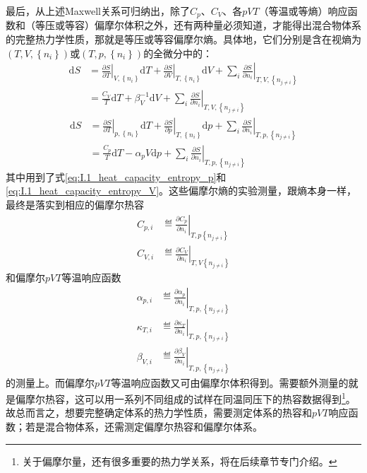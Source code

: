 \documentclass[main.tex]{subfiles}
\begin{document}
最后，从上述Maxwell关系可归纳出，除了$C_p$、$C_V$、各$pVT$（等温或等熵）响应函数和（等压或等容）偏摩尔体积之外，还有两种量必须知道，才能得出混合物体系的完整热力学性质，那就是等压或等容偏摩尔熵。具体地，它们分别是含在视熵为$\left(T,V,\left\{n_i\right\}\right)$或$\left(T,p,\left\{n_i\right\}\right)$的全微分中的：
\begin{equation}
    \begin{aligned}
        \mathrm{d}S & =\left.\frac{\partial S}{\partial T}\right|_{V,\left\{n_i\right\}}\mathrm{d}T+\left.\frac{\partial S}{\partial V}\right|_{T,\left\{n_i\right\}}\mathrm{d}V+\sum_i\left.\frac{\partial S}{\partial n_i}\right|_{T,V,\left\{n_{j\neq i}\right\}} \\
                    & =\frac{C_V}{T}\mathrm{d}T+\beta_V^{-1}\mathrm{d}V+\sum_i\left.\frac{\partial S}{\partial n_i}\right|_{T,V,\left\{n_{j\neq i}\right\}} \label{eq:I.1_dS_T_V}
    \end{aligned}
\end{equation}
\begin{equation}
    \begin{aligned}
        \mathrm{d}S & =\left.\frac{\partial S}{\partial T}\right|_{p,\left\{n_i\right\}}\mathrm{d}T+\left.\frac{\partial S}{\partial p}\right|_{T,\left\{n_i\right\}}\mathrm{d}p+\sum_i\left.\frac{\partial S}{\partial n_i}\right|_{T,p,\left\{n_{j\neq i}\right\}} \\
                    & =\frac{C_p}{T}\mathrm{d}T-\alpha_pV\mathrm{d}p+\sum_i\left.\frac{\partial S}{\partial n_i}\right|_{T,p,\left\{n_{j\neq i}\right\}}\label{eq:I.1_dS_T_p}
    \end{aligned}
\end{equation}
其中用到了式\eqref{eq:I.1_heat_capacity_entropy_p}和\eqref{eq:I.1_heat_capacity_entropy_V}。这些偏摩尔熵的实验测量，跟熵本身一样，最终是落实到相应的偏摩尔热容
\begin{align}
    C_{p,i} & \eqdef\left.\frac{\partial C_p}{\partial n_i}\right|_{T,p\left\{n_{j\neq i}\right\}} \\
    C_{V,i} & \eqdef\left.\frac{\partial C_V}{\partial n_i}\right|_{T,V\left\{n_{j\neq i}\right\}}
\end{align}
和偏摩尔$pVT$等温响应函数
\begin{align}
    \alpha_{p,i} & \eqdef\left.\frac{\partial \alpha_p}{\partial n_i}\right|_{T,p,\left\{n_{j\neq i}\right\}} \\
    \kappa_{T,i} & \eqdef\left.\frac{\partial \kappa_T}{\partial n_i}\right|_{T,p,\left\{n_{j\neq i}\right\}} \\
    \beta_{V,i}  & \eqdef\left.\frac{\partial \beta_V}{\partial n_i}\right|_{T,p,\left\{n_{j\neq i}\right\}}
\end{align}
的测量上。而偏摩尔$pVT$等温响应函数又可由偏摩尔体积得到。需要额外测量的就是偏摩尔热容，这可以用一系列不同组成的试样在同温同压下的热容数据得到\footnote{关于偏摩尔量，还有很多重要的热力学关系，将在后续章节专门介绍。}。故总而言之，想要完整确定体系的热力学性质，需要测定体系的热容和$pVT$响应函数；若是混合物体系，还需测定偏摩尔热容和偏摩尔体系。
\end{document}

